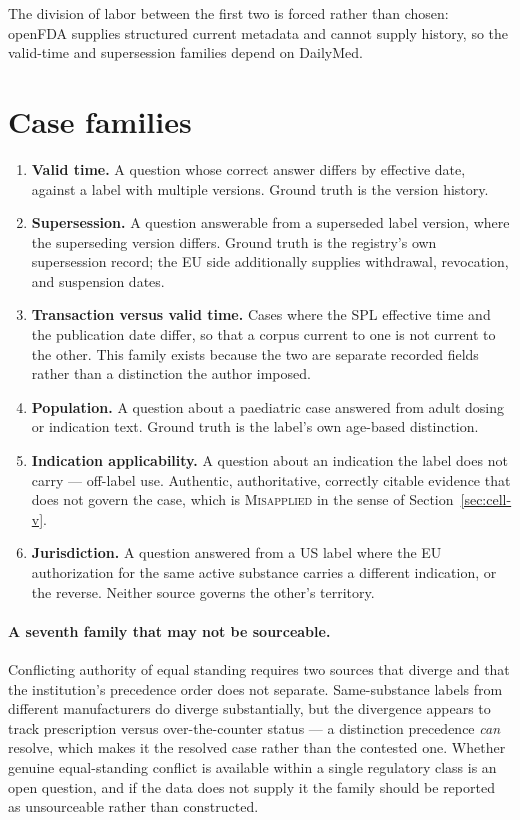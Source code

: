 The division of labor between the first two is forced rather than chosen: openFDA
supplies structured current metadata and cannot supply history, so the valid-time and
supersession families depend on DailyMed.

\section{Case families}

\begin{enumerate}
  \item \textbf{Valid time.} A question whose correct answer differs by effective date,
        against a label with multiple versions. Ground truth is the version history.
  \item \textbf{Supersession.} A question answerable from a superseded label version,
        where the superseding version differs. Ground truth is the registry's own
        supersession record; the EU side additionally supplies withdrawal, revocation,
        and suspension dates.
  \item \textbf{Transaction versus valid time.} Cases where the SPL effective time and
        the publication date differ, so that a corpus current to one is not current to
        the other. This family exists because the two are separate recorded fields
        rather than a distinction the author imposed.
  \item \textbf{Population.} A question about a paediatric case answered from adult
        dosing or indication text. Ground truth is the label's own age-based
        distinction.
  \item \textbf{Indication applicability.} A question about an indication the label does
        not carry --- off-label use. Authentic, authoritative, correctly citable
        evidence that does not govern the case, which is
        \textsc{Misapplied} in the sense of Section~\ref{sec:cell-v}.
  \item \textbf{Jurisdiction.} A question answered from a US label where the EU
        authorization for the same active substance carries a different indication, or
        the reverse. Neither source governs the other's territory.
\end{enumerate}

\paragraph{A seventh family that may not be sourceable.} Conflicting authority of equal
standing requires two sources that diverge and that the institution's precedence order
does not separate. Same-substance labels from different manufacturers do diverge
substantially, but the divergence appears to track prescription versus
over-the-counter status --- a distinction precedence \emph{can} resolve, which makes it
the resolved case rather than the contested one. Whether genuine equal-standing conflict
is available within a single regulatory class is an open question, and if the data does
not supply it the family should be reported as unsourceable rather than constructed.

